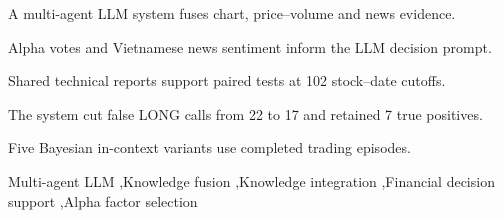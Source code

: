 \documentclass[preprint,12pt]{elsarticle}
\begin{document}
\begin{frontmatter}


\begin{highlights}
\item A multi-agent LLM system fuses chart, price--volume and news evidence.
\item Alpha votes and Vietnamese news sentiment inform the LLM decision prompt.
\item Shared technical reports support paired tests at 102 stock--date cutoffs.
\item The system cut false LONG calls from 22 to 17 and retained 7 true positives.
\item Five Bayesian in-context variants use completed trading episodes.
\end{highlights}

\begin{keyword}
Multi-agent LLM \sep Knowledge fusion \sep Knowledge integration \sep Financial decision support \sep Alpha factor selection
\end{keyword}

\end{frontmatter}














\end{document}
